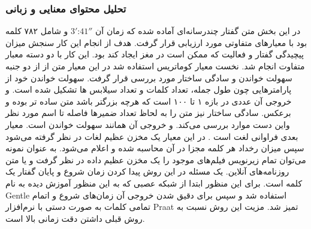 \subsubsection{تحلیل محتوای‌ معنایی و زبانی}
در این بخش متن گفتار چندرسانه‌ای آماده شده که زمان آن
$3'\text{:}41''$
و شامل ۷۸۲ کلمه بود با معیارهای متفاوتی مورد ارزیابی قرار گرفت. هدف از انجام این کار سنجش میزان پیچیدگی گفتار و فعالیت که ممکن است در مغز ایجاد کند بود. این کار با دو دسته معبار متفاوت انجام شد. نخست معیار کوماتریس 
\cite{castro2020validating}
استفاده شد در این معیار متن از از دو جنبه سهولت خواندن و سادگی ساختار مورد بررسی قرار گرفت.
\newline
سهولت خواندن خود از پارامتر‌هایی چون طول جمله، تعداد کلمات و تعداد سیلابس ها تشکیل شده است. و خروجی آن عددی در بازه ۱ تا ۱۰۰ است که هرچه بزرگتر باشد متن ساده تر بوده و برعکس. سادگی ساختار نیز متن را به لحاظ تعداد ضمیرها فاصله تا اسم مورد نظر واین دست موارد بررسی می‌کند. و خروجی آن همانند سهولت خواندن است. 
\newline
معیار بعدی فراوانی لغت
است
\cite{brodbeck2018neural}.
در این معیار یک مخزن عظیم لغات در نظر گرفته می‌شود سپس میزان رخداد هر کلمه مجزا در آن محاسبه شده و اعلام می‌شود. به عنوان نمونه می‌توان تمام زیرنویس فیلم‌های موجود را یک مخزن عظیم داده در نظر گرفت و یا متن روزنامه‌های آنلاین. 
یک مسئله در این روش پیدا کردن زمان شروع و پایان گفتار یک کلمه است. برای این منظور ابتدا از شبکه عصبی که به این منظور آموزش دیده به نام Gentle استفاده شد و سپس برای دقیق شدن خروجی آن زمان‌های شروع و اتمام تمامی کلمات به صورت دستی با نرم‌افزار Praat تمیز شد. مزیت این روش نسبت به روش قبلی داشتن دقت زمانی بالا است.
